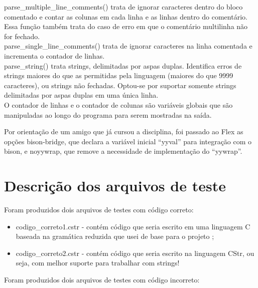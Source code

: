 \documentclass[12pt]{article}
\begin{document}
parse\_multiple\_line\_comments() trata de ignorar caracteres dentro do bloco comentado e contar as colunas em cada linha e as linhas dentro do comentário. Essa função também trata do caso de erro em que o comentário multilinha não for fechado.\\

parse\_single\_line\_comments() trata de ignorar caracteres na linha comentada e incrementa o contador de linhas.\\

parse\_string() trata strings, delimitadas por aspas duplas. Identifica erros de strings maiores do que as permitidas pela linguagem (maiores do que 9999 caracteres), ou strings não fechadas. Optou-se por suportar somente strings delimitadas por aspas duplas em uma única linha.\\

O contador de linhas e o contador de colunas são variáveis globais que são manipuladas ao longo do programa para serem mostradas na saída.

Por orientação de um amigo que já cursou a disciplina, foi passado ao Flex as opções bison-bridge, que declara a variável inicial ``yyval'' para integração com o bison, e noyywrap, que remove a necessidade de implementação do ``yywrap''.

\section{Descrição dos arquivos de teste}

\indent
Foram produzidos dois arquivos de testes com código correto:

\begin{itemize}
	\item codigo\_correto1.cstr - contém código que seria escrito em uma linguagem C baseada na gramática reduzida que usei de base para o projeto \cite{minic};
	\item codigo\_correto2.cstr - contém código que seria escrito na linguagem CStr, ou seja, com melhor suporte para trabalhar com strings!\\
\end{itemize}

Foram produzidos dois arquivos de testes com código incorreto:
\end{document}
